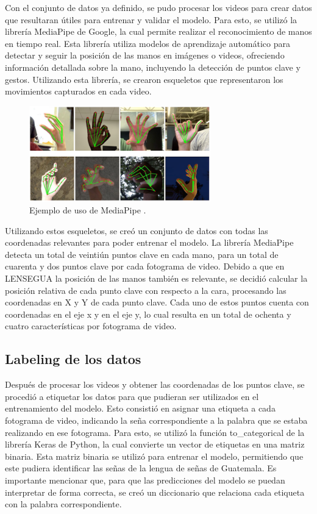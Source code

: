 Con el conjunto de datos ya definido, se pudo procesar los videos para crear datos que resultaran útiles para entrenar y validar el modelo.  
Para esto, se utilizó la librería MediaPipe de Google, la cual permite realizar el reconocimiento de manos en tiempo real.  
Esta librería utiliza modelos de aprendizaje automático para detectar y seguir la posición de las manos en imágenes o videos, ofreciendo información detallada sobre la mano, incluyendo la detección de puntos clave y gestos.  
Utilizando esta librería, se crearon esqueletos que representaron los movimientos capturados en cada video. 

\begin{figure}[H]
    \centering
    \includegraphics[width=0.7\textwidth]{figuras/Mediapipe.png}
    \caption{Ejemplo de uso de MediaPipe \cite{mediapipe}.}
    \label{fig:mediapipe uso}
\end{figure}

Utilizando estos esqueletos, se creó un conjunto de datos con todas las coordenadas relevantes para poder entrenar el modelo.
La librería MediaPipe detecta un total de veintiún puntos clave en cada mano, para un total de cuarenta y dos puntos clave por cada fotograma de video.
Debido a que en LENSEGUA la posición de las manos también es relevante, se decidió calcular la posición relativa de cada punto clave con respecto a la cara, procesando las coordenadas en X y Y de cada punto clave.
Cada uno de estos puntos cuenta con coordenadas en el eje x y en el eje y, lo cual resulta en un total de ochenta y cuatro características por fotograma de video.

\subsection{Labeling de los datos}
Después de procesar los videos y obtener las coordenadas de los puntos clave, se procedió a etiquetar los datos para que pudieran ser utilizados en el entrenamiento del modelo.
Esto consistió en asignar una etiqueta a cada fotograma de video, indicando la seña correspondiente a la palabra que se estaba realizando en ese fotograma.
Para esto, se utilizó la función to\_categorical de la librería Keras de Python, la cual convierte un vector de etiquetas en una matriz binaria.
Esta matriz binaria se utilizó para entrenar el modelo, permitiendo que este pudiera identificar las señas de la lengua de señas de Guatemala.
Es importante mencionar que, para que las predicciones del modelo se puedan interpretar de forma correcta, se creó un diccionario que relaciona cada etiqueta con la palabra correspondiente.


